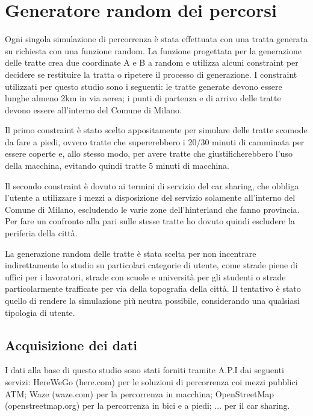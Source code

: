 \section{Generatore random dei percorsi}

Ogni singola simulazione di percorrenza è stata effettuata con una tratta generata su richiesta con una funzione random. La funzione progettata per la generazione delle tratte crea due coordinate A e B a random e utilizza alcuni constraint per decidere se restituire la tratta o ripetere il processo di generazione. I constraint utilizzati per questo studio sono i seguenti: le tratte generate devono essere lunghe almeno 2km in via aerea; i punti di partenza e di arrivo delle tratte devono essere all'interno del Comune di Milano.

Il primo constraint è stato scelto appositamente per simulare delle tratte scomode da fare a piedi, ovvero tratte che supererebbero i 20/30 minuti di camminata per essere coperte e, allo stesso modo, per avere tratte che giustificherebbero l'uso della macchina, evitando quindi tratte 5 minuti di macchina.

Il secondo constraint è dovuto ai termini di servizio del car sharing, che obbliga l'utente a utilizzare i mezzi a disposizione del servizio solamente all'interno del Comune di Milano, escludendo le varie zone dell'hinterland che fanno provincia. Per fare un confronto alla pari sulle stesse tratte ho dovuto quindi escludere la periferia della città.

La generazione random delle tratte è stata scelta per non incentrare indirettamente lo studio su particolari categorie di utente, come strade piene di uffici per i lavoratori, strade con scuole e università per gli studenti o strade particolarmente trafficate per via della topografia della città. Il tentativo è stato quello di rendere la simulazione più neutra possibile, considerando una qualsiasi tipologia di utente.


\subsection{Acquisizione dei dati}

I dati alla base di questo studio sono stati forniti tramite A.P.I dai seguenti servizi: HereWeGo (here.com) per le soluzioni di percorrenza coi mezzi pubblici ATM; Waze (waze.com) per la percorrenza in macchina; OpenStreetMap (openstreetmap.org) per la percorrenza in bici e a piedi; ... per il car sharing.

